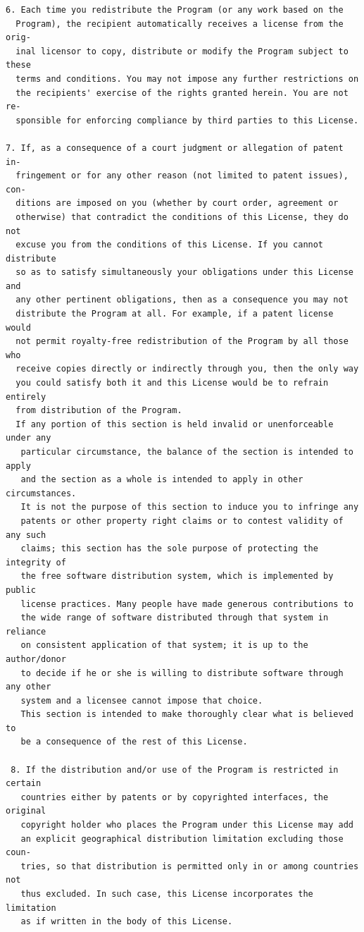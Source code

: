 \documentclass[11pt]{report}
\begin{document}
\begin{appendix}
\begin{verbatim}
6. Each time you redistribute the Program (or any work based on the
  Program), the recipient automatically receives a license from the orig-
  inal licensor to copy, distribute or modify the Program subject to these
  terms and conditions. You may not impose any further restrictions on
  the recipients' exercise of the rights granted herein. You are not re-
  sponsible for enforcing compliance by third parties to this License.

7. If, as a consequence of a court judgment or allegation of patent in-
  fringement or for any other reason (not limited to patent issues), con-
  ditions are imposed on you (whether by court order, agreement or
  otherwise) that contradict the conditions of this License, they do not
  excuse you from the conditions of this License. If you cannot distribute
  so as to satisfy simultaneously your obligations under this License and
  any other pertinent obligations, then as a consequence you may not
  distribute the Program at all. For example, if a patent license would
  not permit royalty-free redistribution of the Program by all those who
  receive copies directly or indirectly through you, then the only way
  you could satisfy both it and this License would be to refrain entirely
  from distribution of the Program.
  If any portion of this section is held invalid or unenforceable under any
   particular circumstance, the balance of the section is intended to apply
   and the section as a whole is intended to apply in other circumstances.
   It is not the purpose of this section to induce you to infringe any
   patents or other property right claims or to contest validity of any such
   claims; this section has the sole purpose of protecting the integrity of
   the free software distribution system, which is implemented by public
   license practices. Many people have made generous contributions to
   the wide range of software distributed through that system in reliance
   on consistent application of that system; it is up to the author/donor
   to decide if he or she is willing to distribute software through any other
   system and a licensee cannot impose that choice.
   This section is intended to make thoroughly clear what is believed to
   be a consequence of the rest of this License.

 8. If the distribution and/or use of the Program is restricted in certain
   countries either by patents or by copyrighted interfaces, the original
   copyright holder who places the Program under this License may add
   an explicit geographical distribution limitation excluding those coun-
   tries, so that distribution is permitted only in or among countries not
   thus excluded. In such case, this License incorporates the limitation
   as if written in the body of this License.


\end{verbatim}
\end{appendix}
\end{document}
